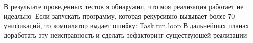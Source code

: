 В результате проведенных тестов я обнаружил, что моя реализация работает не идеально. Если запускать программу, которая рекурсивно вызывает более 70 унификаций, то компилятор выдает ошибку: Task.run.loop
В дальнейших планах доработать эту неисправность и сделать рефакторинг существуюшей реализации
